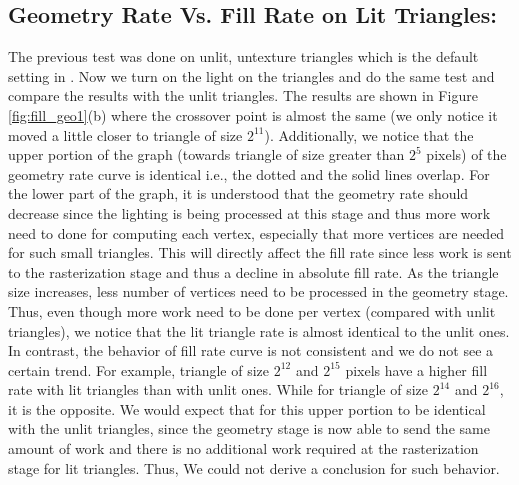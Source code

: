 \subsection{Geometry Rate Vs. Fill Rate on Lit Triangles:}\label{sec:lit}
The previous test was done on unlit, untexture triangles which is the default setting in \protect{\wes}. Now we turn on the light on the triangles and do the same test and compare the results with the unlit triangles. The results are shown in Figure \ref{fig:fill_geo1}(b) where the crossover point is almost the same (we only notice it moved a little closer to triangle of size $2^{11}$). Additionally, we notice that the upper portion of the graph (towards triangle of size greater than $2^{5}$ pixels) of the geometry rate curve is identical i.e., the dotted and the solid lines overlap. For the lower part of the graph, it is understood that the geometry rate should decrease since the lighting is being processed at this stage and thus more work need to done for computing each vertex, especially that more vertices are needed for such small triangles. This will directly affect the fill rate since less work is sent to the rasterization stage and thus a decline in absolute fill rate. As the triangle size increases, less number of vertices need to be processed in the geometry stage. Thus, even though more work need to be done per vertex (compared with unlit triangles), we notice that the lit triangle rate is almost identical to the unlit ones. In contrast, the behavior of fill rate curve is not consistent and we do not see a certain trend. For example, triangle of size $2^{12}$ and $ 2^{15}$ pixels have a higher fill rate with lit triangles than with unlit ones. While for triangle of size $2^{14}$ and $2^{16}$, it is the opposite. We would expect that for this upper portion to be identical with the unlit triangles, since the geometry stage is now able to send the same amount of work and there is no additional work required at the rasterization stage for lit triangles. Thus, We could not derive a conclusion for such behavior.

